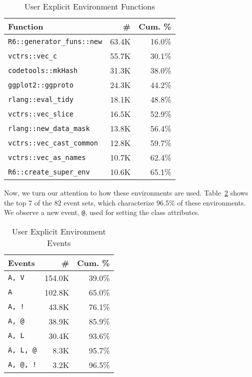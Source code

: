 \documentclass[10pt,review,sigplan,authorversion=true]{acmart}
\renewcommand{\c}[1]{\lstinline |#1|\xspace}
\begin{document}
\begin{table}[!h]
  \small
  \caption{User Explicit Environment Functions} \label{table:user_explicit_fun}
  \centering
  \begin{tabular}{lrr}
    \toprule
    \textbf{Function}&\textbf{\#}&\textbf{Cum. \%}\\
    \midrule
    \c{R6::generator_funs::new}&63.4K&16.0\%\\
    \c{vctrs::vec_c}&55.7K&30.1\%\\
    \c{codetools::mkHash}&31.3K&38.0\%\\
    \c{ggplot2::ggproto}&24.3K&44.2\%\\
    \c{rlang::eval_tidy}&18.1K&48.8\%\\
    \c{vctrs::vec_slice}&16.5K&52.9\%\\
    \c{rlang::new_data_mask}&13.8K&56.4\%\\
    \c{vctrs::vec_cast_common}&12.8K&59.7\%\\
    \c{vctrs::vec_as_names}&10.7K&62.4\%\\
    \c{R6::create_super_env}&10.6K&65.1\%\\
    \bottomrule
  \end{tabular}
\end{table}

Now, we turn our attention to how these environments are used.
Table~\ref{table:user_explicit_env_seq} shows the top 7 of the 82 event sets,
which characterize 96.5\% of these environments. We observe a new event,
\texttt{@}, used for setting the class attributes.

\begin{table}[!h]\small
  \caption{User Explicit Environment Events} \label{table:user_explicit_env_seq}
  \centering
  \begin{tabular}{lrr}
    \toprule
    \textbf{Events}&\textbf{\#}&\textbf{Cum. \%}\\
    \midrule
    \texttt{A, V}&154.0K&39.0\%\\
    \texttt{A}&102.8K&65.0\%\\
    \texttt{A, !}&43.8K&76.1\%\\
    \texttt{A, @}&38.9K&85.9\%\\
    \texttt{A, L}&30.4K&93.6\%\\
    \texttt{A, L, @}&8.3K&95.7\%\\
    \texttt{A, @, !}&3.2K&96.5\%\\
    \bottomrule
  \end{tabular}
\end{table}
\end{document}
